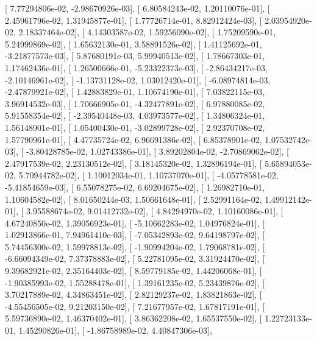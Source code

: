 \documentclass{article}
\begin{document}
       [  7.77294806e-02,  -2.98670926e-03],
       [  6.80584243e-02,   1.20110076e-01],
       [  2.45961796e-02,   1.31945877e-01],
       [  1.77726714e-01,   8.82912424e-03],
       [  2.03954920e-02,   2.18337464e-02],
       [  4.14303587e-02,   1.59256090e-02],
       [  1.75209590e-01,   5.24999869e-02],
       [  1.65632130e-01,   3.58891526e-02],
       [  1.41125692e-01,  -3.21877573e-03],
       [  5.87680191e-03,   5.99940513e-02],
       [  1.78667303e-01,   1.17462436e-01],
       [  1.26500666e-01,  -5.23322373e-03],
       [ -2.86434217e-03,  -2.10146961e-02],
       [ -1.13731128e-02,   1.03012420e-01],
       [ -6.08974814e-03,  -2.47879921e-02],
       [  1.42883829e-01,   1.10674190e-01],
       [  7.03822115e-03,   3.96914532e-03],
       [  1.70666905e-01,  -4.32477891e-02],
       [  6.97880085e-02,   5.91558354e-02],
       [ -2.39540448e-03,   4.03973577e-02],
       [  1.34806324e-01,   1.56148901e-01],
       [  1.05400430e-01,  -3.02899728e-02],
       [  2.92370708e-02,   1.57790961e-01],
       [  4.47735724e-02,   6.96691386e-02],
       [  6.85378901e-02,   1.07532742e-03],
       [ -3.80428785e-02,   1.02743386e-01],
       [  3.89202804e-02,  -2.70869062e-02],
       [  2.47917539e-02,   2.23130512e-02],
       [  3.18145320e-02,   1.32896194e-01],
       [  5.65894053e-02,   5.70944782e-02],
       [  1.10012034e-01,   1.10737070e-01],
       [ -4.05778581e-02,  -5.41854659e-03],
       [  6.55078275e-02,   6.69204675e-02],
       [  1.26982710e-01,   1.10604582e-02],
       [  8.01650244e-03,   1.50661648e-01],
       [  2.52991164e-02,   1.49912142e-01],
       [  3.95588674e-02,   9.01412732e-02],
       [  4.84294970e-02,   1.10160086e-01],
       [  4.67240850e-02,   1.39056923e-01],
       [ -5.10662283e-02,   1.04976824e-01],
       [  1.02913866e-01,   7.94961410e-03],
       [ -7.05342893e-02,   9.64198797e-02],
       [  5.74456300e-02,   1.59978813e-02],
       [ -1.90994204e-02,   1.79068781e-02],
       [ -6.66094349e-02,   7.37378883e-02],
       [  5.22781095e-02,   3.31924470e-02],
       [  9.39682921e-02,   2.35164403e-02],
       [  8.59779185e-02,   1.44206068e-01],
       [ -1.90385993e-02,   1.55288478e-01],
       [  1.39161235e-02,   5.23439876e-02],
       [  3.70217889e-02,   4.34863451e-02],
       [  2.82129237e-02,   1.83821863e-02],
       [ -4.55456505e-02,   9.21203150e-02],
       [  7.21677957e-02,   1.67817191e-01],
       [  5.59736890e-02,   1.46370402e-01],
       [  3.86362208e-02,   1.65537550e-02],
       [  1.22723133e-01,   1.45290826e-01],
       [ -1.86758989e-02,   4.40847306e-03],
\end{document}
